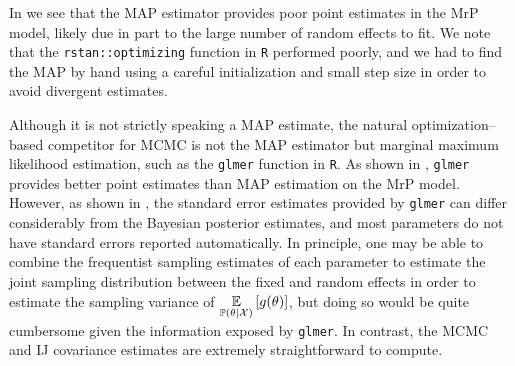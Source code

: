 \MRPMAPGraph{}

\MRPLMERGraph{}

\MRPLMERSdGraph{}

In  we see that the MAP estimator provides poor point
estimates in the MrP model, likely due in part to the large number of random
effects to fit.  We note that the \texttt{rstan::optimizing} function in \texttt{R}
performed poorly, and we had to find the MAP by hand using a careful initialization
and small step size in order to avoid divergent estimates.

Although it is not strictly speaking a MAP estimate, the natural
optimization--based competitor for MCMC is not the MAP estimator but
marginal maximum likelihood estimation, such as the \texttt{glmer} function
in \texttt{R}.  As shown in , \texttt{glmer} provides
better point estimates than MAP estimation on the MrP model.  However,
as shown in , the standard error estimates
provided by \texttt{glmer} can differ considerably from the Bayesian posterior
estimates, and most parameters do not have standard errors reported automatically.
In principle, one may be able to combine the frequentist sampling estimates of each
parameter to estimate the joint sampling distribution between the fixed and random effects
in order to estimate the sampling variance of $\underset{\mathbb{P}(\theta | {\mathcal{X}})}{\mathbb{E}}\left[g(\theta)\right]$,
but doing so would be quite cumbersome given the information exposed by \texttt{glmer}.
In contrast, the MCMC and IJ covariance estimates are extremely straightforward
to compute. 